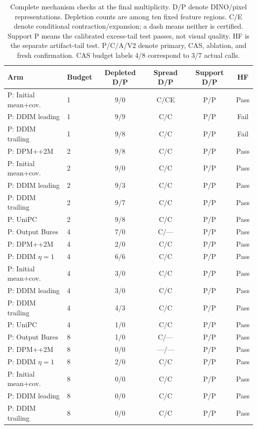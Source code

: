 \begin{table}[t]
\centering
\small
\setlength{\tabcolsep}{3.5pt}
\caption{Complete mechanism checks at the final multiplicity. D/P denote DINO/pixel representations. Depletion counts are among ten fixed feature regions. C/E denote conditional contraction/expansion; a dash means neither is certified. Support P means the calibrated excess-tail test passes, not visual quality. HF is the separate artifact-tail test. P/C/A/V2 denote primary, CAS, ablation, and fresh confirmation. CAS budget labels 4/8 correspond to 3/7 actual calls.}
\label{tab:cifar_gates}
\begin{tabular}{llcccc}
\toprule
Arm & Budget & Depleted D/P & Spread D/P & Support D/P & HF \\
\midrule
P: Initial mean+cov. & 1 & 9/0 & C/CE & P/P & Pass \\
P: DDIM leading & 1 & 9/9 & C/C & P/P & Fail \\
P: DDIM trailing & 1 & 9/8 & C/C & P/P & Fail \\
P: DPM++2M & 2 & 9/8 & C/C & P/P & Pass \\
P: Initial mean+cov. & 2 & 9/0 & C/C & P/P & Pass \\
P: DDIM leading & 2 & 9/3 & C/C & P/P & Pass \\
P: DDIM trailing & 2 & 9/7 & C/C & P/P & Pass \\
P: UniPC & 2 & 9/8 & C/C & P/P & Pass \\
P: Output Bures & 4 & 7/0 & C/--- & P/P & Pass \\
P: DPM++2M & 4 & 2/0 & C/C & P/P & Pass \\
P: DDIM $\eta=1$ & 4 & 6/6 & C/C & P/P & Pass \\
P: Initial mean+cov. & 4 & 3/0 & C/C & P/P & Pass \\
P: DDIM leading & 4 & 3/0 & C/C & P/P & Pass \\
P: DDIM trailing & 4 & 4/3 & C/C & P/P & Pass \\
P: UniPC & 4 & 1/0 & C/C & P/P & Pass \\
P: Output Bures & 8 & 1/0 & C/--- & P/P & Pass \\
P: DPM++2M & 8 & 0/0 & ---/--- & P/P & Pass \\
P: DDIM $\eta=1$ & 8 & 2/0 & C/C & P/P & Pass \\
P: Initial mean+cov. & 8 & 0/0 & C/C & P/P & Pass \\
P: DDIM leading & 8 & 0/0 & C/C & P/P & Pass \\
P: DDIM trailing & 8 & 0/0 & C/C & P/P & Pass \\

\end{tabular}
\end{table}
